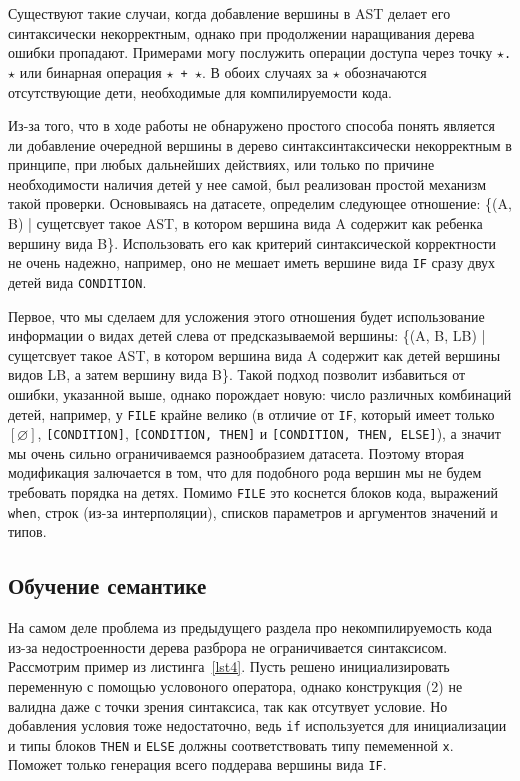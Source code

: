 \documentclass[times,specification,annotation]{itmo-student-thesis}
\begin{document}
Существуют такие случаи, когда добавление вершины в AST делает его синтаксически некорректным, однако при продолжении наращивания дерева ошибки пропадают. Примерами могу послужить операции доступа через точку \texttt{$\star$.$\star$} или бинарная операция \texttt{$\star$ + $\star$}. В обоих случаях за $\star$ обозначаются отсутствующие дети, необходимые для компилируемости кода.

Из-за того, что в ходе работы не обнаружено простого способа понять является ли добавление очередной вершины в дерево синтаксинтаксически некорректным в принципе, при любых дальнейших действиях, или только по причине необходимости наличия детей у нее самой, был реализован простой механизм такой проверки. Основываясь на датасете, определим следующее отношение: \{(A, B) | сущетсвует такое AST, в котором вершина вида A содержит как ребенка вершину вида B\}. Использовать его как критерий синтаксической корректности не очень надежно, например, оно не мешает иметь вершине вида \texttt{IF} сразу двух детей вида \texttt{CONDITION}.

Первое, что мы сделаем для усложения этого отношения будет использование информации о видах детей слева от предсказываемой вершины: \{(A, B, LB) | сущетсвует такое AST, в котором вершина вида A содержит как детей вершины видов LB, а затем вершину вида B\}. Такой подход позволит избавиться от ошибки, указанной выше, однако порождает новую: число различных комбинаций детей, например, у \texttt{FILE} крайне велико (в отличие от \texttt{IF}, который имеет только $[\varnothing]$, \texttt{[CONDITION]}, \texttt{[CONDITION, THEN]} и \texttt{[CONDITION, THEN, ELSE]}), а значит мы очень сильно ограничиваемся разнообразием датасета. Поэтому вторая модификация залючается в том, что для подобного рода вершин мы не будем требовать порядка на детях. Помимо \texttt{FILE} это коснется блоков кода, выражений \texttt{when}, строк (из-за интерполяции), списков параметров и аргументов значений и типов.

\subsection{Обучение семантике}\label{fit:syntax}
На самом деле проблема из предыдущего раздела про некомпилируемость кода из-за недостроенности дерева разброра не ограничивается синтаксисом. Рассмотрим пример из листинга~\ref{lst4}. Пусть решено инициализировать переменную с помощью условоного оператора, однако конструкция (2) не валидна даже с точки зрения синтаксиса, так как отсутвует условие. Но добавления условия тоже недостаточно, ведь \texttt{if} используется для инициализации и типы блоков \texttt{THEN} и \texttt{ELSE} должны соответствовать типу пемеменной \texttt{x}. Поможет только генерация всего поддерава вершины вида \texttt{IF}.
\end{document}
